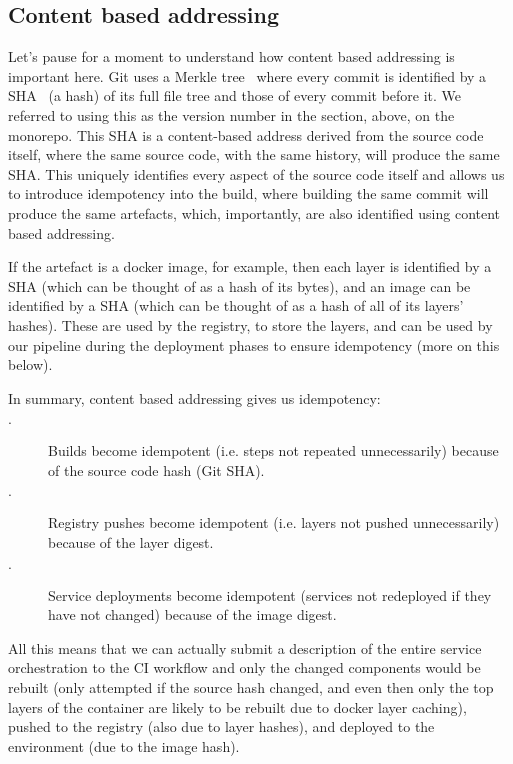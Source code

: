 \documentclass[reprint,amsmath,amssymb,aps]{revtex4-1}
\begin{document}
\subsection{\label{sec:cba}Content based addressing}

Let's pause for a moment to understand how content based addressing is important here. Git uses a Merkle tree~\cite{Merkletr83:online} where every commit is identified by a SHA~\cite{SecureHa13:online} (a hash) of its full file tree and those of every commit before it. We referred to using this as the version number in the section, above, on the monorepo. This SHA is a content-based address derived from the source code itself, where the same source code, with the same history, will produce the same SHA. This uniquely identifies every aspect of the source code itself and allows us to introduce idempotency into the build, where building the same commit will produce the same artefacts, which, importantly, are also identified using content based addressing.

If the artefact is a docker image, for example, then each layer is identified by a SHA (which can be thought of as a hash of its bytes), and an image can be identified by a SHA (which can be thought of as a hash of all of its layers' hashes). These are used by the registry, to store the layers, and can be used by our pipeline during the deployment phases to ensure idempotency (more on this below).

In summary, content based addressing gives us idempotency:
\begin{description}
	\item[\(\cdot\)] Builds become idempotent (i.e. steps not repeated unnecessarily) because of the source code hash (Git SHA).
	\item[\(\cdot\)] Registry pushes become idempotent (i.e. layers not pushed unnecessarily) because of the layer digest.
	\item[\(\cdot\)] Service deployments become idempotent (services not redeployed if they have not changed) because of the image digest.
\end{description}
All this means that we can actually submit a description of the entire service orchestration to the CI workflow and only the changed components would be rebuilt (only attempted if the source hash changed, and even then only the top layers of the container are likely to be rebuilt due to docker layer caching), pushed to the registry (also due to layer hashes), and deployed to the environment (due to the image hash).
\end{document}
